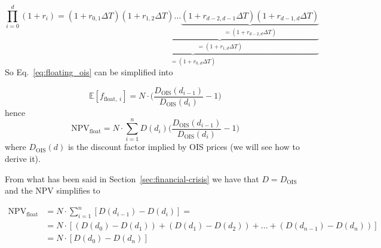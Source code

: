 \begin{equation*}
\prod_{i=0}^{d} (1+r_i) = \underbrace{(1+r_{0,1}\Delta T)\underbrace{(1+r_{1,2}\Delta T)\ldots\underbrace{(1+r_{d-2,d-1}\Delta T)(1+r_{d-1,d}\Delta T)}_{=(1+r_{d-2,d}\Delta T)}}_{=(1+r_{1,d}\Delta T)}}_{=(1+r_{0,d}\Delta T)}
\end{equation*}
So Eq.~\ref{eq:floating_ois} can be simplified into

\begin{equation}
\mathbb{E}[f_{\mathrm{float},~i}] = N\cdot\Big(\frac{D_{\mathrm{OIS}}(d_{i-1})}{D_{\mathrm{OIS}}(d_{i})} - 1\Big)
\end{equation}
hence
\begin{equation}
\mathrm{NPV}_{\mathrm{float}} = N\cdot \sum_{i=1}^{n}D(d_i) \Big(\frac{D_{\mathrm{OIS}}(d_{i-1})}{D_{\mathrm{OIS}}(d_{i})} - 1\Big)
\end{equation}
where \(D_{\mathrm{OIS}}(d)\) is the discount factor implied by OIS
prices (we will see how to derive it).

%

From what has been said in Section~\ref{sec:financial-crisis} we have that 
\(D = D_{\mathrm{OIS}}\) and the NPV simplifies to

\begin{equation}
  \begin{split}
    \mathrm{NPV}_{\mathrm{float}} & = N\cdot\sum_{i=1}^{n}[D(d_{i-1}) - D(d_i)] =  \\
    &= N\cdot[(D(d_{0}) - D(d_{1})) + (D(d_{1}) - D(d_{2})) + ... + (D(d_{n-1}) - D(d_{n}))]\\
    &= N \cdot [D(d_0) - D(d_n)]
  \end{split}
\end{equation}

